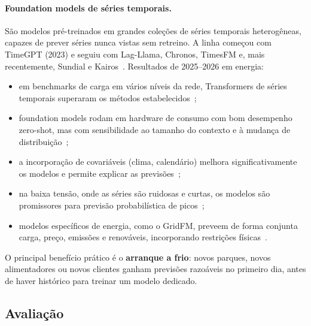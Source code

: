 \documentclass[10pt,a4paper,oneside]{article}
\begin{document}
\paragraph{Foundation models de séries temporais.} São modelos pré-treinados
em grandes coleções de séries temporais heterogêneas, capazes de prever
séries nunca vistas sem retreino. A linha começou com TimeGPT (2023) e seguiu
com Lag-Llama, Chronos, TimesFM e, mais recentemente, Sundial e
Kairos~\cite{fmreview}. Resultados de 2025--2026 em energia:
\begin{itemize}
  \item em benchmarks de carga em vários níveis da rede, Transformers de
    séries temporais superaram os métodos estabelecidos~\cite{loadbenchmark};
  \item foundation models rodam em hardware de consumo com bom desempenho
    zero-shot, mas com sensibilidade ao tamanho do contexto e à mudança de
    distribuição~\cite{tsfmconsumer};
  \item a incorporação de covariáveis (clima, calendário) melhora
    significativamente os modelos e permite explicar as previsões~\cite{tsfmxai};
  \item na baixa tensão, onde as séries são ruidosas e curtas, os modelos são
    promissores para previsão probabilística de picos~\cite{lvpeak};
  \item modelos específicos de energia, como o GridFM, preveem de forma
    conjunta carga, preço, emissões e renováveis, incorporando restrições
    físicas~\cite{gridfm}.
\end{itemize}
O principal benefício prático é o \textbf{arranque a frio}: novos parques,
novos alimentadores ou novos clientes ganham previsões razoáveis no primeiro
dia, antes de haver histórico para treinar um modelo dedicado.

\subsection{Avaliação}
\end{document}
